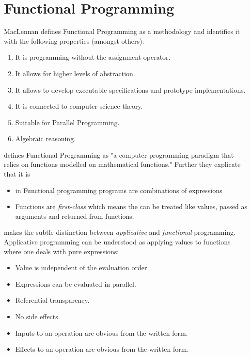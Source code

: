 \chapter{Functional Programming}
MacLennan \cite{maclennan_functional_1990} defines Functional Programming as a methodology and identifies it with the following properties (amongst others):

\begin{enumerate}
	\item It is programming without the assignment-operator.
	\item It allows for higher levels of abstraction.
	\item It allows to develop executable specifications and prototype implementations.
	\item It is connected to computer science theory.
	\item Suitable for Parallel Programming.
	\item Algebraic reasoning.
\end{enumerate}

\cite{allen_haskell_2016} defines Functional Programming as "a computer programming paradigm that relies on functions modelled on mathematical functions." Further they explicate that it is 
\begin{itemize}
	\item in Functional programming programs are combinations of expressions
	\item Functions are \textit{first-class} which means the can be treated like values, passed as arguments and returned from functions.
\end{itemize}

\cite{maclennan_functional_1990} makes the subtle distinction between \textit{applicative} and \textit{functional} programming. Applicative programming can be understood as applying values to functions where one deals with pure expressions:

\begin{itemize}
	\item Value is independent of the evaluation order.
	\item Expressions can be evaluated in parallel.
	\item Referential transparency.
	\item No side effects.
	\item Inputs to an operation are obvious from the written form.
	\item Effects to an operation are obvious from the written form.
\end{itemize}


